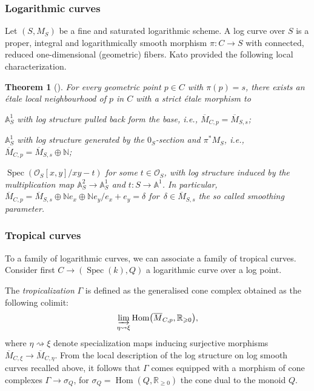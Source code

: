 \documentclass[11pt]{article}
\numberwithin{equation}{section}
\newcommand{\RR}{\mathbb{R}}
\renewcommand{\geq}{\geqslant}
\numberwithin{equation}{section}
\newtheorem{theo}{Theorem}[section]
\theoremstyle{definition}
\begin{document}
\subsubsection{Logarithmic curves}
Let $(S,M_S)$ be a fine and saturated logarithmic scheme. A log curve over $S$ is a proper, integral and logarithmically smooth morphism $\pi\colon C\to S$ with connected, reduced one-dimensional (geometric) fibers.
Kato provided the following local characterization.
\begin{theo}[\cite{KatoF}]
For every geometric point $p\in C$ with $\pi(p)=s$, there exists an \'etale local neighbourhood of $p$ in $C$ with a strict \'etale morphism to
\begin{description}\itemsep=0pt
 \item[\emph{smooth point:}] $\mathbb A^1_S$ with log structure pulled back form the base, i.e., $\overline{M}_{C,p}=\overline M_{S,s}$;
 \item[\emph{marking:}] $\mathbb A^1_S$ with log structure generated by the $0_S$-section and $\pi^*M_S$, i.e., $\overline{M}_{C,p}=\overline M_{S,s}\oplus \mathbb N$;
 \item[\emph{node:}] $\operatorname{Spec}(\mathcal O_S[x,y]/xy-t)$ for some $t\in\mathcal O_S$, with log structure induced by the multiplication map $\mathbb A^2_S\to\mathbb A^1_S$ and $t\colon S\to \mathbb A^1$. In particular, $\overline{M}_{C,p}=\overline M_{S,s}\oplus \mathbb N e_x\oplus \mathbb N e_y\slash e_x+e_y=\delta$ for~${\delta\in \overline{M}_{S,s}}$ the so called \emph{smoothing parameter}.
\end{description}
\end{theo}

\subsubsection{Tropical curves}

To a family of logarithmic curves, we can associate a family of tropical curves.
Consider first $C\to (\operatorname{Spec}(k),Q)$ a logarithmic curve over a log point.

The \emph{tropicalization} $\Gamma$ is defined as the generalised cone complex obtained as the following colimit:
\[
\varinjlim_{\eta\rightsquigarrow\xi} \operatorname{Hom}\bigl(\overline{M}_{C,p},\mathbb R_{\geq 0}\bigr),
\]
where $\eta\rightsquigarrow\xi$ denote specialization maps inducing surjective morphisms $\overline{M}_{C,\xi}\to\overline{M}_{C,\eta}$. From the local description of the log structure on log smooth curves recalled above, it follows that $\Gamma$ comes equipped with a morphism of cone complexes
$\Gamma\to\sigma_Q $,
for $\sigma_Q=\operatorname{Hom}(Q,\RR_{\geqslant 0})$ the cone dual to the monoid $Q$.
\end{document}
